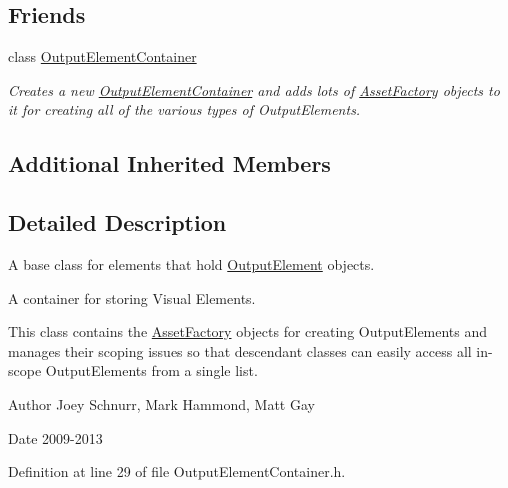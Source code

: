 \subsection*{Friends}
\begin{DoxyCompactItemize}
\item 
\hypertarget{class_picto_1_1_output_element_container_a1c7ff6e9d726da3de4233947b1c049ff}{class \hyperlink{class_picto_1_1_output_element_container_a1c7ff6e9d726da3de4233947b1c049ff}{Output\-Element\-Container}}\label{class_picto_1_1_output_element_container_a1c7ff6e9d726da3de4233947b1c049ff}

\begin{DoxyCompactList}\small\item\em Creates a new \hyperlink{class_picto_1_1_output_element_container}{Output\-Element\-Container} and adds lots of \hyperlink{class_picto_1_1_asset_factory}{Asset\-Factory} objects to it for creating all of the various types of Output\-Elements. \end{DoxyCompactList}\end{DoxyCompactItemize}
\subsection*{Additional Inherited Members}


\subsection{Detailed Description}
A base class for elements that hold \hyperlink{class_picto_1_1_output_element}{Output\-Element} objects. 

A container for storing Visual Elements.

This class contains the \hyperlink{class_picto_1_1_asset_factory}{Asset\-Factory} objects for creating Output\-Elements and manages their scoping issues so that descendant classes can easily access all in-\/scope Output\-Elements from a single list. \begin{DoxyAuthor}{Author}
Joey Schnurr, Mark Hammond, Matt Gay 
\end{DoxyAuthor}
\begin{DoxyDate}{Date}
2009-\/2013 
\end{DoxyDate}


Definition at line 29 of file Output\-Element\-Container.\-h.



